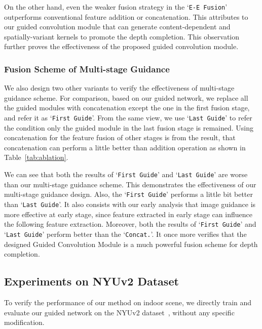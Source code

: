 \documentclass[journal]{IEEEtran}
\begin{document}
On the other hand, even the weaker fusion strategy in the `\texttt{E-E Fusion}' outperforms conventional feature addition or concatenation.
This attributes to our guided convolution module that can generate content-dependent and spatially-variant kernels to promote the depth completion.
This observation further proves the effectiveness of the proposed guided convolution module.



\subsubsection{Fusion Scheme of Multi-stage Guidance}
We also design two other variants to verify the effectiveness of multi-stage guidance scheme.
For comparison, based on our guided network, we replace all the guided modules with concatenation except the one in the first fusion stage,
and refer it as `\texttt{First Guide}'.
From the same view, we use `\texttt{Last Guide}' to refer the condition only the guided module in the last fusion stage is remained.
Using concatenation for the feature fusion of other stages is from the result,
that concatenation can perform a little better than addition operation as shown in Table~\ref{tab:ablation}.



We can see that both the results of `\texttt{First Guide}' and `\texttt{Last Guide}' are worse than our multi-stage guidance scheme.
This demonstrates the effectiveness of our multi-stage guidance design.
Also, the `\texttt{First Guide}' performs a little bit better than `\texttt{Last Guide}'.
It also consists with our early analysis that image guidance is more effective at early stage,
since feature extracted in early stage can influence the following feature extraction.
Moreover, both the results of `\texttt{First Guide}' and `\texttt{Last Guide}' perform better than the `\texttt{Concat.}'.
It once more verifies that the designed Guided Convolution Module is a much powerful fusion scheme for depth completion.



\subsection{Experiments on NYUv2 Dataset}
\label{subsec:result_nyu_v2}
To verify the performance of our method on indoor scene, 
we directly train and evaluate our guided network on the NYUv2 dataset~\cite{NYU_V2}, without any specific modification. 
\end{document}
